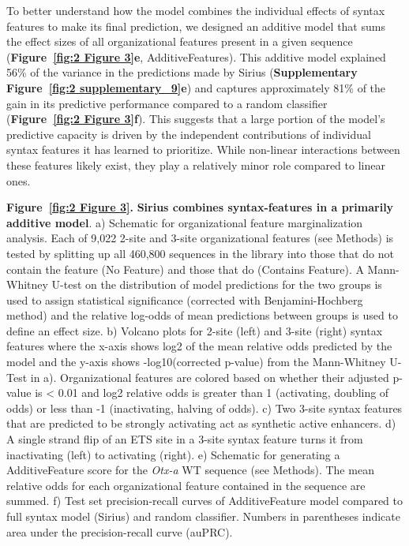To better understand how the model combines the individual effects of syntax features to make its final prediction, we designed an additive model that sums the effect sizes of all organizational features present in a given sequence (\textbf{Figure~\ref{fig:2 Figure 3}e}, AdditiveFeatures). This additive model explained 56\% of the variance in the predictions made by Sirius (\textbf{Supplementary Figure~\ref{fig:2 supplementary_9}e}) and captures approximately 81\% of the gain in its predictive performance compared to a random classifier (\textbf{Figure~\ref{fig:2 Figure 3}f}). This suggests that a large portion of the model’s predictive capacity is driven by the independent contributions of individual syntax features it has learned to prioritize. While non-linear interactions between these features likely exist, they play a relatively minor role compared to linear ones.

\clearpage
\thispagestyle{plain}
\noindent
\textbf{Figure~\ref{fig:2 Figure 3}.} \textbf{Sirius combines syntax-features in a primarily additive model}. a) Schematic for organizational feature marginalization analysis. Each of 9,022 2-site and 3-site organizational features (see Methods) is tested by splitting up all 460,800 sequences in the library into those that do not contain the feature (No Feature) and those that do (Contains Feature). A Mann-Whitney U-test on the distribution of model predictions for the two groups is used to assign statistical significance (corrected with Benjamini-Hochberg method) and the relative log-odds of mean predictions between groups is used to define an effect size. b) Volcano plots for 2-site (left) and 3-site (right) syntax features where the x-axis shows log2 of the mean relative odds predicted by the model and the y-axis shows -log10(corrected p-value) from the Mann-Whitney U-Test in a). Organizational features are colored based on whether their adjusted p-value is < 0.01 and log2 relative odds is greater than 1 (activating, doubling of odds) or less than -1 (inactivating, halving of odds). c) Two 3-site syntax features that are predicted to be strongly activating act as synthetic active enhancers. d) A single strand flip of an ETS site in a 3-site syntax feature turns it from inactivating (left) to activating (right). e) Schematic for generating a AdditiveFeature score for the \textit{Otx-a} WT sequence (see Methods). The mean relative odds for each organizational feature contained in the sequence are summed. f) Test set precision-recall curves of AdditiveFeature model compared to full syntax model (Sirius) and random classifier. Numbers in parentheses indicate area under the precision-recall curve (auPRC).

